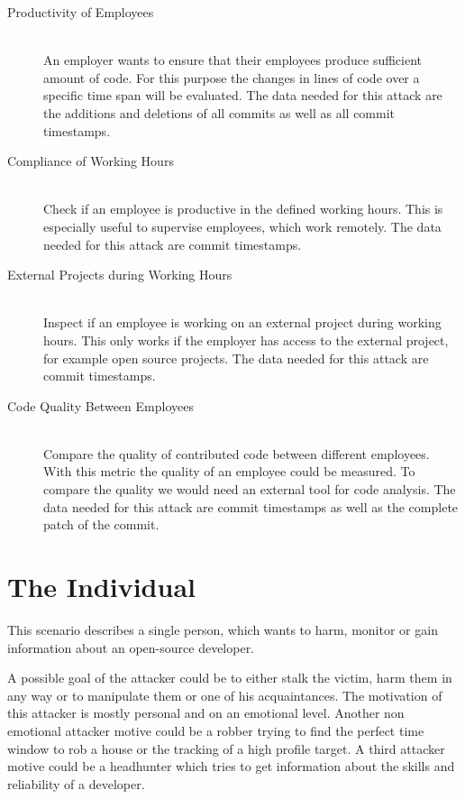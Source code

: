 \begin{description}
    \item[Productivity of Employees] \hfill \\
        An employer wants to ensure that their employees produce sufficient amount of code.
        For this purpose the changes in lines of code over a specific time span will be evaluated.
        The data needed for this attack are the additions and deletions of all commits as well as all commit timestamps.

    \item[Compliance of Working Hours] \hfill \\
        Check if an employee is productive in the defined working hours.
        This is especially useful to supervise employees, which work remotely.
        The data needed for this attack are commit timestamps.

    \item[External Projects during Working Hours] \hfill \\
        Inspect if an employee is working on an external project during working hours.
        This only works if the employer has access to the external project, for example open source projects.
        The data needed for this attack are commit timestamps.

    \item[Code Quality Between Employees] \hfill \\
        Compare the quality of contributed code between different employees.
        With this metric the quality of an employee could be measured.
        To compare the quality we would need an external tool for code analysis.
        The data needed for this attack are commit timestamps as well as the complete patch of the commit.
\end{description}



\section{The Individual}
This scenario describes a single person, which wants to harm, monitor or gain information about an open-source developer.

A possible goal of the attacker could be to either stalk the victim, harm them in any way or to manipulate them or one of his acquaintances.
The motivation of this attacker is mostly personal and on an emotional level.
Another non emotional attacker motive could be a robber trying to find the perfect time window to rob a house or the tracking of a high profile target.
A third attacker motive could be a headhunter which tries to get information about the skills and reliability of a developer.

